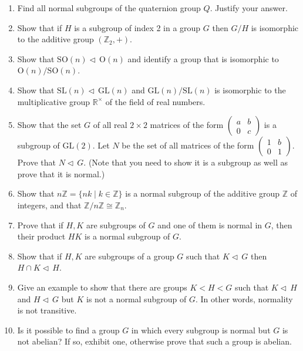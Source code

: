 \documentclass[11pt]{article}
\newenvironment{problems}
{
 \begin{enumerate}[topsep=1pt,itemsep=0pt,parsep=2pt,leftmargin=0.6cm,%
 label={\arabic*.}, ref=\arabic*] \small
}
{
 \end{enumerate}
}
\theoremstyle{definition}
\newcommand{\R}{\mathbb{R}} %
\newcommand{\Z}{\mathbb{Z}} %
\newcommand{\GL}{\mathrm{GL}}
\newcommand{\SL}{\mathrm{SL}}
\renewcommand{\O}{\mathrm{O}}
\newcommand{\SO}{\mathrm{SO}}
\newcommand{\normal}{\triangleleft\,}%
\begin{document}
\begin{problems}
\item Find all normal subgroups of the quaternion
  group $Q$. Justify your answer.

\item Show that if $H$ is a subgroup of index 2 in a group $G$ then
  $G/H$ is isomorphic to the additive group $(\Z_2,+)$.

\item Show that $\SO(n) \normal \O(n)$ and identify a group that is
  isomorphic to $\O(n)/\SO(n)$.

\item Show that $\SL(n) \normal \GL(n)$ and $\GL(n)/\SL(n)$ is
  isomorphic to the multiplicative group $\R^\times$ of the field of
  real numbers.

\item Show that the set $G$ of all real $2 \times 2$ matrices of the
  form $\left(
  \begin{matrix}
    a&b\\0&c
  \end{matrix}
  \right)$ is a subgroup of $\GL(2)$. Let $N$ be the set of all
  matrices of the form  $\left(
  \begin{matrix}
    1&b\\0&1
  \end{matrix}
  \right)$. Prove that $N \normal G$. (Note that you need to show it
  is a subgroup as well as prove that it is normal.)

\item Show that $n\Z = \{nk \mid k \in \Z\}$ is a normal subgroup of
  the additive group $\Z$ of integers, and that $\Z/n\Z \cong \Z_n$.

\item Prove that if $H,K$ are subgroups of $G$ and one of them is
  normal in $G$, then their product $HK$ is a normal subgroup of $G$.

\item Show that if $H, K$ are subgroups of a group $G$ such that $K
  \normal G$ then $H \cap K \normal H$. 

\item{} Give an example to show that
  there are groups $K < H < G$ such that $K \normal H$ and
  $H \normal G$ but $K$ is not a normal subgroup of $G$. In other
  words, normality is not transitive.

\item Is it possible to find a group $G$ in which every subgroup is
  normal but $G$ is not abelian? If so, exhibit one, otherwise prove
  that such a group is abelian.
\end{problems}
\end{document}

